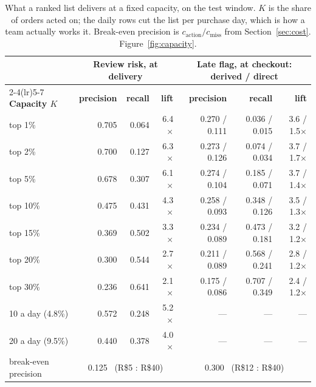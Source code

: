 \begin{table}[htbp]
\centering
\caption{What a ranked list delivers at a fixed capacity, on the test window.
$K$ is the share of orders acted on; the daily rows cut the list per purchase
day, which is how a team actually works it. Break-even precision is
$c_{\text{action}}/c_{\text{miss}}$ from Section~\ref{sec:cost}.
Figure~\ref{fig:capacity}.}
\label{tab:capacity}
\footnotesize
{\setlength{\tabcolsep}{2.6pt}
\begin{tabular}{@{}lrrrrrr@{}}
\toprule
 & \multicolumn{3}{c}{\textbf{Review risk, at delivery}} & \multicolumn{3}{c}{\textbf{Late flag, at checkout: derived / direct}} \\
\cmidrule(lr){2-4}\cmidrule(lr){5-7}
\textbf{Capacity $K$} & \textbf{precision} & \textbf{recall} & \textbf{lift} & \textbf{precision} & \textbf{recall} & \textbf{lift} \\
\midrule
top 1\%  & 0.705 & 0.064 & 6.4$\times$ & 0.270 / 0.111 & 0.036 / 0.015 & 3.6 / 1.5$\times$ \\
top 2\%  & 0.700 & 0.127 & 6.3$\times$ & 0.273 / 0.126 & 0.074 / 0.034 & 3.7 / 1.7$\times$ \\
top 5\%  & 0.678 & 0.307 & 6.1$\times$ & 0.274 / 0.104 & 0.185 / 0.071 & 3.7 / 1.4$\times$ \\
top 10\% & 0.475 & 0.431 & 4.3$\times$ & 0.258 / 0.093 & 0.348 / 0.126 & 3.5 / 1.3$\times$ \\
top 15\% & 0.369 & 0.502 & 3.3$\times$ & 0.234 / 0.089 & 0.473 / 0.181 & 3.2 / 1.2$\times$ \\
top 20\% & 0.300 & 0.544 & 2.7$\times$ & 0.211 / 0.089 & 0.568 / 0.241 & 2.8 / 1.2$\times$ \\
top 30\% & 0.236 & 0.641 & 2.1$\times$ & 0.175 / 0.086 & 0.707 / 0.349 & 2.4 / 1.2$\times$ \\
\midrule
10 a day (4.8\%) & 0.572 & 0.248 & 5.2$\times$ & --- & --- & --- \\
20 a day (9.5\%) & 0.440 & 0.378 & 4.0$\times$ & --- & --- & --- \\
\midrule
break-even precision & \multicolumn{3}{c}{0.125 \ (R\$5 : R\$40)} & \multicolumn{3}{c}{0.300 \ (R\$12 : R\$40)} \\
\bottomrule
\end{tabular}}
\end{table}


